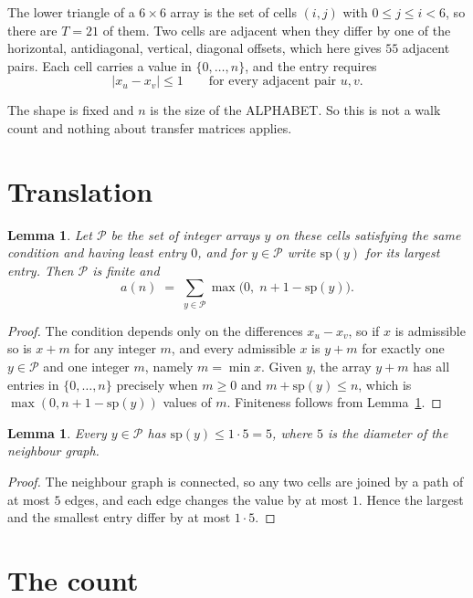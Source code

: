 \documentclass[11pt,a4paper]{article}
\theoremstyle{plain}
\newtheorem{lemma}[theorem]{Lemma}
\theoremstyle{definition}
\begin{document}
The lower triangle of a $6\times6$ array is the set of cells $(i,j)$ with $0\le j\le
i<6$, so there are $T=21$ of them. Two cells are adjacent when they differ by one of the
horizontal, antidiagonal, vertical, diagonal offsets, which here gives $55$ adjacent pairs. Each cell carries a value in
$\{0,\dots,n\}$, and the entry requires
\[
|x_u-x_v|\le 1\qquad\text{for every adjacent pair }u,v .
\]

The shape is fixed and $n$ is the size of the ALPHABET. So this is not a walk count and
nothing about transfer matrices applies.

\section{Translation}

\begin{lemma}\label{lem:trans}
Let $\mathcal P$ be the set of integer arrays $y$ on these cells satisfying the same condition
and having least entry $0$, and for $y\in\mathcal P$ write $\mathrm{sp}(y)$ for its largest
entry. Then $\mathcal P$ is finite and
\[
a(n)\;=\;\sum_{y\in\mathcal P}\max\bigl(0,\;n+1-\mathrm{sp}(y)\bigr).
\]
\end{lemma}

\begin{proof}
The condition depends only on the differences $x_u-x_v$, so if $x$ is admissible so is $x+m$
for any integer $m$, and every admissible $x$ is $y+m$ for exactly one $y\in\mathcal P$ and one
integer $m$, namely $m=\min x$. Given $y$, the array $y+m$ has all entries in
$\{0,\dots,n\}$ precisely when $m\ge0$ and $m+\mathrm{sp}(y)\le n$, which is
$\max(0,n+1-\mathrm{sp}(y))$ values of $m$. Finiteness follows from
Lemma~\ref{lem:bound}.
\end{proof}

\begin{lemma}\label{lem:bound}
Every $y\in\mathcal P$ has $\mathrm{sp}(y)\le 1\cdot5=5$, where $5$ is the
diameter of the neighbour graph.
\end{lemma}

\begin{proof}
The neighbour graph is connected, so any two cells are joined by a path of at most $5$
edges, and each edge changes the value by at most $1$. Hence the largest and the smallest
entry differ by at most $1\cdot5$.
\end{proof}

\section{The count}
\end{document}
